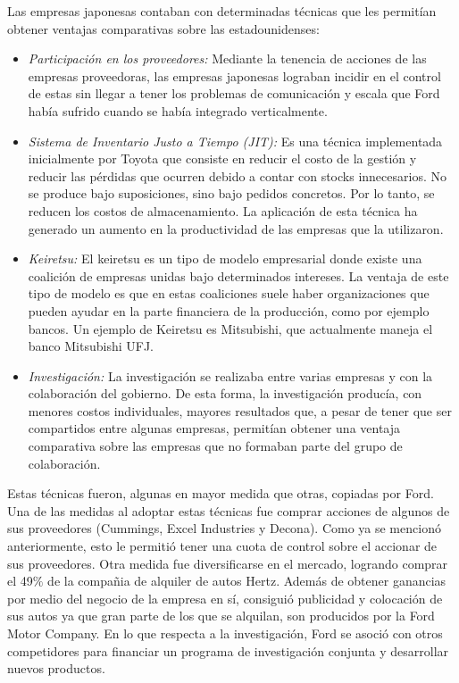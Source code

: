 		Las empresas japonesas contaban con determinadas t\'ecnicas que les permitían obtener ventajas comparativas sobre las estadounidenses:
		\begin{itemize}
			\item{\emph{Participaci\'on en los proveedores:}}
				Mediante la tenencia de acciones de las empresas proveedoras, las empresas japonesas lograban incidir en el control de estas sin llegar a tener los problemas de comunicaci\'on y escala que Ford había sufrido cuando se había integrado verticalmente.

			\item{\emph{Sistema de Inventario Justo a Tiempo (JIT):}}
				Es una t\'ecnica implementada inicialmente por Toyota que consiste en reducir el costo de la gesti\'on y reducir las p\'erdidas que ocurren debido a contar con stocks innecesarios.
				No se produce bajo suposiciones, sino bajo pedidos concretos.
				Por lo tanto, se reducen los costos de almacenamiento.
				La aplicaci\'on de esta t\'ecnica ha generado un aumento en la productividad de las empresas que la utilizaron.

			\item{\emph{Keiretsu:}}
				El keiretsu es un tipo de modelo empresarial donde existe una coalici\'on de empresas unidas bajo determinados intereses.
				La ventaja de este tipo de modelo es que en estas coaliciones suele haber organizaciones que pueden ayudar en la parte financiera de la producci\'on, como por ejemplo bancos.
				Un ejemplo de Keiretsu es Mitsubishi, que actualmente maneja el banco Mitsubishi UFJ.

			\item{\emph{Investigaci\'on:}}
				La investigaci\'on se realizaba entre varias empresas y con la colaboraci\'on del gobierno.
				De esta forma, la investigaci\'on producía, con menores costos individuales, mayores resultados que, a pesar de tener que ser compartidos entre algunas empresas, permitían obtener una ventaja comparativa sobre las empresas que no formaban parte del grupo de colaboraci\'on.

		\end{itemize}

		Estas t\'ecnicas fueron, algunas en mayor medida que otras, copiadas por Ford.
		Una de las medidas al adoptar estas t\'ecnicas fue comprar acciones de algunos de sus proveedores (Cummings, Excel Industries y Decona).
		Como ya se mencion\'o anteriormente, esto le permiti\'o tener una cuota de control sobre el accionar de sus proveedores.
		Otra medida fue diversificarse en el mercado, logrando comprar el 49$\%$ de la compa\~nia de alquiler de autos Hertz. Adem\'as de obtener ganancias por medio del negocio de la empresa en sí, consigui\'o publicidad y colocaci\'on de sus autos ya que gran parte de los que se alquilan, son producidos por la Ford Motor Company.
		En lo que respecta a la investigaci\'on, Ford se asoci\'o con otros competidores para financiar un programa de investigaci\'on conjunta y desarrollar nuevos productos.

